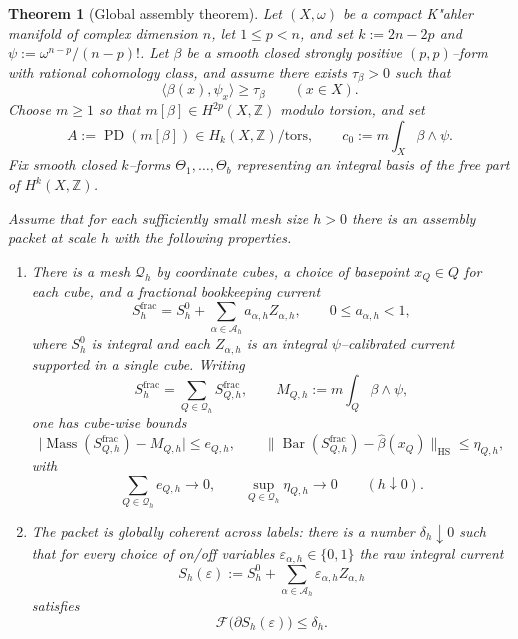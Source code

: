 \documentclass[11pt]{article}
\numberwithin{equation}{section}
\theoremstyle{plain}
\newtheorem{theorem}{Theorem}[section]
\theoremstyle{definition}
\theoremstyle{remark}
\DeclareMathOperator{\Mass}{Mass}
\DeclareMathOperator{\HS}{HS}
\DeclareMathOperator{\PD}{PD}
\newcommand{\Z}{\mathbb{Z}}
\newcommand{\calF}{\mathcal{F}}
\newcommand{\calQ}{\mathcal{Q}}
\newcommand{\calA}{\mathcal{A}}
\newcommand{\Bary}{\operatorname{Bar}}
\begin{document}
\begin{theorem}[Global assembly theorem]\label{thm:main}
Let $(X,\omega)$ be a compact K"ahler manifold of complex dimension $n$, let $1\le p<n$, and set $k:=2n-2p$ and $\psi:=\omega^{n-p}/(n-p)!$.  Let $\beta$ be a smooth closed strongly positive $(p,p)$--form with rational cohomology class, and assume there exists $\tau_\beta>0$ such that
\[
\langle\beta(x),\psi_x\rangle\ge \tau_\beta
\qquad (x\in X).
\]
Choose $m\ge 1$ so that $m[\beta]\in H^{2p}(X,\Z)$ modulo torsion, and set
\[
A:=\PD(m[\beta])\in H_k(X,\Z)/\mathrm{tors},
\qquad
c_0:=m\int_X \beta\wedge\psi.
\]
Fix smooth closed $k$--forms $\Theta_1,\dots,\Theta_b$ representing an integral basis of the free part of $H^k(X,\Z)$.

Assume that for each sufficiently small mesh size $h>0$ there is an \emph{assembly packet at scale $h$} with the following properties.
\begin{enumerate}
\item[\textnormal{(A1)}] There is a mesh $\calQ_h$ by coordinate cubes, a choice of basepoint $x_Q\in Q$ for each cube, and a fractional bookkeeping current
\[
S_h^{\mathrm{frac}}=S_h^0+\sum_{\alpha\in\calA_h} a_{\alpha,h} Z_{\alpha,h},
\qquad
0\le a_{\alpha,h}<1,
\]
where $S_h^0$ is integral and each $Z_{\alpha,h}$ is an integral $\psi$--calibrated current supported in a single cube.  Writing
\[
S_h^{\mathrm{frac}}=\sum_{Q\in\calQ_h} S_{Q,h}^{\mathrm{frac}},
\qquad
M_{Q,h}:=m\int_Q \beta\wedge\psi,
\]
one has cube-wise bounds
\[
\bigl|\Mass(S_{Q,h}^{\mathrm{frac}})-M_{Q,h}\bigr|\le e_{Q,h},
\qquad
\bigl\|\Bary(S_{Q,h}^{\mathrm{frac}})-\widehat\beta(x_Q)\bigr\|_{\HS}\le \eta_{Q,h},
\]
with
\[
\sum_{Q\in\calQ_h} e_{Q,h}\longrightarrow 0,
\qquad
\sup_{Q\in\calQ_h}\eta_{Q,h}\longrightarrow 0
\qquad (h\downarrow 0).
\]

\item[\textnormal{(A2)}] The packet is globally coherent across labels: there is a number $\delta_h\downarrow 0$ such that for every choice of on/off variables $\varepsilon_{\alpha,h}\in\{0,1\}$ the raw integral current
\[
S_h(\varepsilon):=S_h^0+\sum_{\alpha\in\calA_h}\varepsilon_{\alpha,h} Z_{\alpha,h}
\]
satisfies
\[
\calF\bigl(\partial S_h(\varepsilon)\bigr)\le \delta_h.
\]


\end{enumerate}
\end{theorem}
\end{document}

